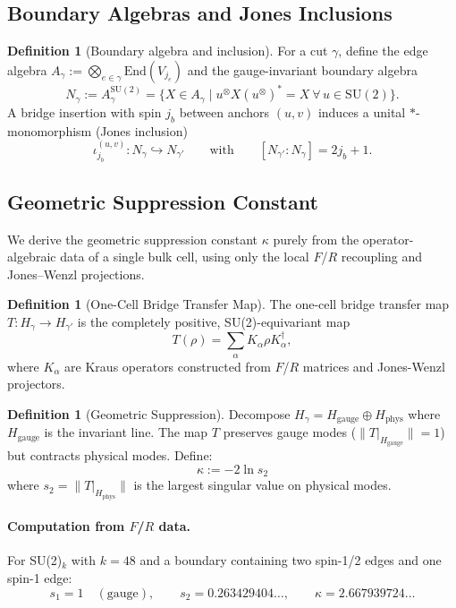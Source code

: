 \documentclass[11pt]{article}
\newcommand{\Index}[2]{\left[#1:#2\right]}
\newcommand{\End}{\mathrm{End}}
\theoremstyle{plain}
\theoremstyle{definition}
\newtheorem{definition}[theorem]{Definition}
\begin{document}
\subsection{Boundary Algebras and Jones Inclusions}

\begin{definition}[Boundary algebra and inclusion]
  For a cut $\gamma$, define the edge algebra $A_\gamma := \bigotimes_{e\in\gamma} \End(V_{j_e})$ and the gauge-invariant boundary algebra
  \[
    N_\gamma := A_\gamma^{\mathrm{SU}(2)} = \{ X\in A_\gamma \mid u^{\otimes} X (u^{\otimes})^\ast = X\ \forall\,u\in \mathrm{SU}(2)\}.
  \]
  A bridge insertion with spin $j_b$ between anchors $(u,v)$ induces a unital $*$-monomorphism (Jones inclusion)
  \[
    \iota^{(u,v)}_{j_b}: N_\gamma \hookrightarrow N_{\gamma'} \qquad\text{with}\qquad \Index{N_{\gamma'}}{N_\gamma}=2j_b+1.
  \]
\end{definition}

\subsection{Geometric Suppression Constant}
\label{sec:kappa-phys}

We derive the geometric suppression constant $\kappa$ purely from the operator-algebraic data of a single bulk cell, using only the local $F$/$R$ recoupling and Jones--Wenzl projections.

\begin{definition}[One-Cell Bridge Transfer Map]
  The one-cell bridge transfer map $T: H_\gamma \to H_{\gamma'}$ is the completely positive, SU(2)-equivariant map
  \[
    T(\rho) = \sum_{\alpha} K_\alpha \rho K_\alpha^\dagger,
  \]
  where $K_\alpha$ are Kraus operators constructed from $F$/$R$ matrices and Jones-Wenzl projectors.
\end{definition}

\begin{definition}[Geometric Suppression]
  Decompose $H_\gamma = H_{\mathrm{gauge}} \oplus H_{\mathrm{phys}}$ where $H_{\mathrm{gauge}}$ is the invariant line. The map $T$ preserves gauge modes ($\|T|_{H_{\mathrm{gauge}}}\| = 1$) but contracts physical modes. Define:
  \begin{equation}
    \kappa := -2\ln s_2
  \end{equation}
  where $s_2 = \|T|_{H_{\mathrm{phys}}}\|$ is the largest singular value on physical modes.
\end{definition}

\paragraph{Computation from $F$/$R$ data.}
For SU(2)$_k$ with $k=48$ and a boundary containing two spin-1/2 edges and one spin-1 edge:
\begin{equation}
  s_1 = 1 \quad (\text{gauge}), \qquad s_2 = 0.263429404\ldots, \qquad \boxed{\kappa = 2.667939724\ldots}
  \label{eq:kappa-numeric}
\end{equation}
\end{document}
